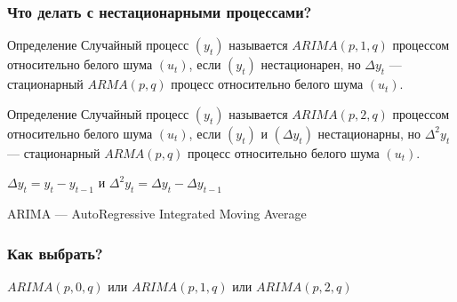 \begin{frame}
  \frametitle{Что делать с нестационарными процессами?}

  \begin{block}{Определение}
    Случайный процесс $(y_t)$ называется $ARIMA(p, 1, q)$ процессом относительно белого шума $(u_t)$, 
    если $(y_t)$ нестационарен, но $\Delta y_t$ — стационарный $ARMA(p, q)$ процесс относительно белого шума $(u_t)$.  
  \end{block}

  \pause

  \begin{block}{Определение}
    Случайный процесс $(y_t)$ называется $ARIMA(p, 2, q)$ процессом относительно белого шума $(u_t)$, 
    если $(y_t)$ и $(\Delta y_t)$ нестационарны, но $\Delta^2 y_t$ — стационарный $ARMA(p, q)$ процесс относительно белого шума $(u_t)$.  
  \end{block}

  \pause
  $\Delta y_t = y_t - y_{t-1}$ и $\Delta^2 y_t = \Delta y_t - \Delta y_{t-1}$

  \pause 
  ARIMA — \alert{A}uto\alert{R}egressive \alert{I}ntegrated \alert{M}oving \alert{A}verage
  
\end{frame}

\begin{frame}
  \frametitle{Как выбрать?}
  
  $ARIMA(p, 0, q)$ или $ARIMA(p, 1, q)$ или $ARIMA(p, 2, q)$
  \begin{itemize}
    

    

    
    
  \end{itemize}

\end{frame}

